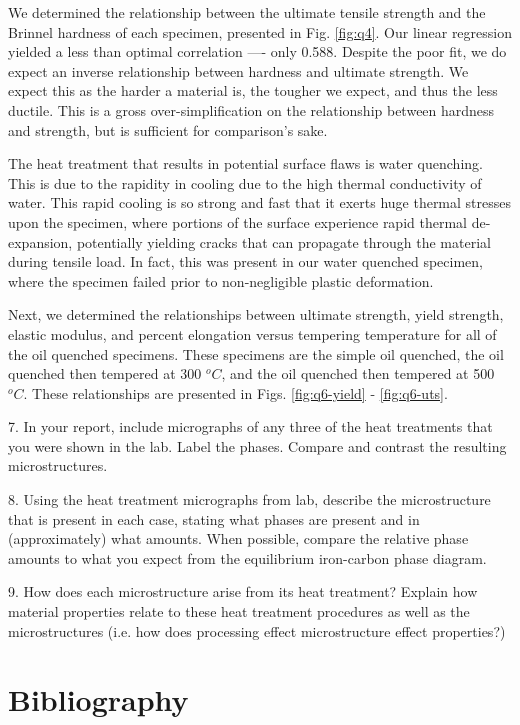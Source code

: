 \documentclass{article}
\begin{document}
We determined the relationship between the ultimate tensile strength and the Brinnel hardness of each specimen, presented in Fig. \ref{fig:q4}. Our linear regression yielded a less than optimal correlation ---- only 0.588. Despite the poor fit, we do expect an inverse relationship between hardness and ultimate strength. We expect this as the harder a material is, the tougher we expect, and thus the less ductile. This is a gross over-simplification on the relationship between hardness and strength, but is sufficient for comparison's sake. 

The heat treatment that results in potential surface flaws is water quenching. This is due to the rapidity in cooling due to the high thermal conductivity of water. This rapid cooling is so strong and fast that it exerts huge thermal stresses upon the specimen, where portions of the surface experience rapid thermal de-expansion, potentially yielding cracks that can propagate through the material during tensile load. In fact, this was present in our water quenched specimen, where the specimen failed prior to non-negligible plastic deformation. 

Next, we determined the relationships between ultimate strength, yield strength, elastic modulus, and percent elongation versus tempering temperature for all of the oil quenched specimens. These specimens are the simple oil quenched, the oil quenched then tempered at 300 $^oC$, and the oil quenched then tempered at 500 $^oC$. These relationships are presented in Figs. \ref{fig:q6-yield} - \ref{fig:q6-uts}.



7. In your report, include micrographs of any three of the heat treatments that you were shown in the lab.
Label the phases. Compare and contrast the resulting microstructures.




8. Using the heat treatment micrographs from lab, describe the microstructure that is present in each case,
stating what phases are present and in (approximately) what amounts. When possible, compare the
relative phase amounts to what you expect from the equilibrium iron-carbon phase diagram.




9. How does each microstructure arise from its heat treatment? Explain how material properties relate to
these heat treatment procedures as well as the microstructures (i.e. how does processing effect
microstructure effect properties?)




\section{Bibliography}
\end{document}
